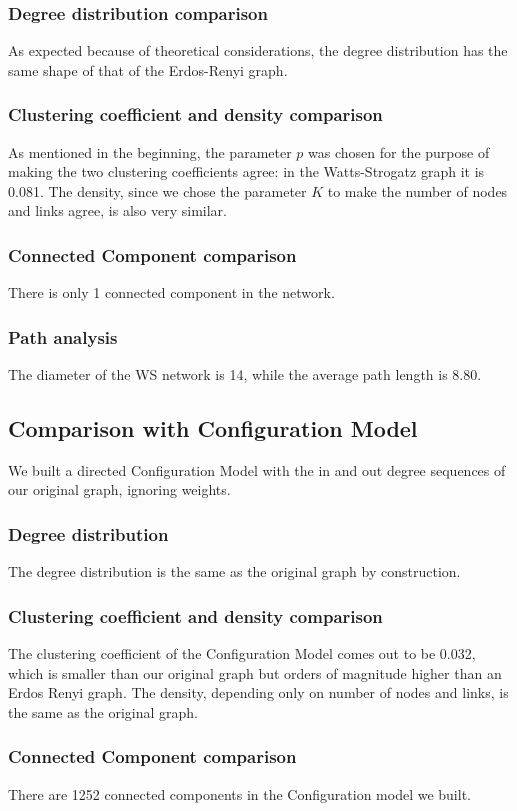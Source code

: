 \documentclass[sigchi]{acmart}
\begin{document}
\subsubsection{Degree distribution comparison}
As expected because of theoretical considerations, the degree distribution has the same shape of that of the Erdos-Renyi graph.
\subsubsection{Clustering coefficient and density comparison}
As mentioned in the beginning, the parameter $p$ was chosen for the purpose of making the two clustering coefficients agree: in the Watts-Strogatz graph it is 0.081. The density, since we chose the parameter $K$ to make the number of nodes and links agree, is also very similar.
\subsubsection{Connected Component comparison}
There is only 1 connected component in the network.
\subsubsection{Path analysis}
The diameter of the WS network is 14, while the average path length is 8.80.

\subsection{Comparison with Configuration Model}
We built a directed Configuration Model with the in and out degree sequences of our original graph, ignoring weights.
\subsubsection{Degree distribution} The degree distribution is the same as the original graph by construction.
\subsubsection{Clustering coefficient and density comparison}
The clustering coefficient of the Configuration Model comes out to be 0.032, which is smaller than our original graph but orders of magnitude higher than an Erdos Renyi graph. The density, depending only on number of nodes and links, is the same as the original graph.
\subsubsection{Connected Component comparison}
There are 1252 connected components in the Configuration model we built.
\end{document}
